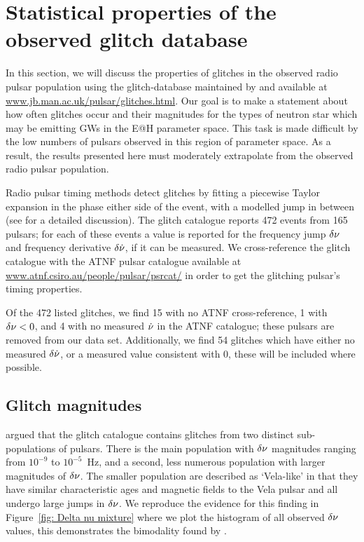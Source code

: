 \documentclass[../full_thesis/full_thesis.tex]{subfiles}
\begin{document}
\section{Statistical properties of the observed glitch database}
\label{sec: statistical properties}
In this section, we will discuss the properties of glitches in the observed
radio pulsar population using the glitch-database maintained by \citet{Espinoza2011}
and available at \url{www.jb.man.ac.uk/pulsar/glitches.html}.
Our goal is to make a statement about how often glitches occur and their
magnitudes for the types of neutron star which may be emitting GWs in the E@H
parameter space. This task is made difficult by the low numbers of pulsars observed
in this region of parameter space. As a result, the results presented here must
moderately extrapolate from the observed radio pulsar population.

Radio pulsar timing methods detect glitches by fitting a piecewise Taylor expansion in
the phase either side of the event, with a modelled jump in between (see
\citet{Edwards2006} for a detailed discussion). The glitch catalogue
\citep{Espinoza2011} reports 472 events from 165 pulsars; for each of these
events a value is reported for the frequency jump $\delta\nu$ and frequency
derivative $\delta\dot{\nu}$, if it can be measured. We
cross-reference the glitch catalogue with the ATNF \citet{ATNF} pulsar
catalogue available at \url{www.atnf.csiro.au/people/pulsar/psrcat/} in order
to get the glitching pulsar's timing properties.

Of the 472 listed glitches, we find 15 with no ATNF cross-reference, 1 with
$\delta\nu < 0$, and 4 with no measured $\dot{\nu}$ in the ATNF catalogue; these
pulsars are removed from our data set. Additionally, we find 54 glitches which
have either no measured $\delta\dot{\nu}$, or a measured value consistent with 0,
these will be included where possible.

\subsection{Glitch magnitudes}
\label{sec: observed glitch magnitude}

\citet{Espinoza2011} argued that the glitch catalogue contains glitches from
two distinct sub-populations of pulsars. There is the main population with
$\delta\nu$ magnitudes ranging from $10^{-9}$ to $10^{-5}$~Hz, and a second,
less numerous population with larger magnitudes of $\delta\nu$. The smaller
population are described as `Vela-like' in that they have similar
characteristic ages and magnetic fields to the Vela pulsar and all undergo
large jumps in $\delta\nu$.  We reproduce the evidence for this finding in
Figure~\ref{fig: Delta nu mixture} where we plot the histogram of all observed
$\delta\nu$ values, this demonstrates the bimodality found by \citet{Espinoza2011}.
\end{document}
